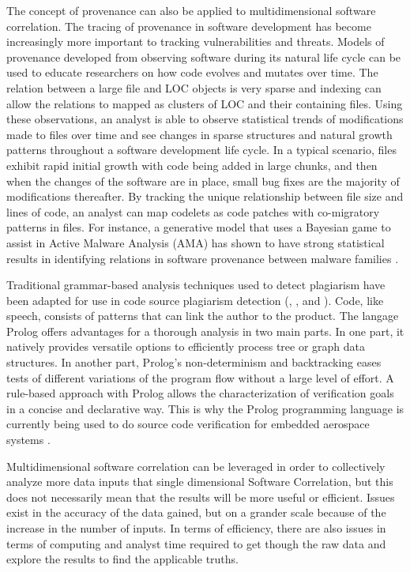 \documentclass[12pt]{report}
\begin{document}
The concept of provenance can also be applied to multidimensional software correlation.  The tracing of provenance in software development has become increasingly more important to tracking vulnerabilities and threats.  Models of provenance developed from observing software during its natural life cycle can be used to educate researchers on how code evolves and mutates over time.  The relation between a large file and LOC objects is very sparse and indexing can allow the relations to mapped as clusters of LOC and their containing files.  Using these observations, an analyst is able to observe statistical trends of modifications made to files over time and see changes in sparse structures and natural growth patterns throughout a software development life cycle.  In a typical scenario, files exhibit rapid initial growth with code being added in large chunks, and then when the changes of the software are in place, small bug fixes are the majority of modifications thereafter.  By tracking the unique relationship between file size and lines of code, an analyst can map codelets as code patches with co-migratory patterns in files.  \cite{provenance2:2014}  For instance, a generative model that uses a Bayesian game to assist in Active Malware Analysis (AMA) has shown to have strong statistical results in identifying relations in software provenance between malware families \cite{sartea2020bayesian}.  

Traditional grammar-based analysis techniques used to detect plagiarism have been adapted for use in code source plagiarism detection (\cite{kustanto2009automatic}, \cite{lesner2010novel}, and \cite{jadalla2008pde4java}).  Code, like speech, consists of patterns that can link the author to the product.  The langage Prolog offers advantages for a thorough analysis in two main parts.  In one part, it natively provides versatile options to efficiently process tree or graph data structures.   In another part, Prolog’s non-determinism and backtracking eases tests of different variations of the program flow without a large level of effort.  A rule-based approach with Prolog allows the characterization of verification goals in a concise and declarative way.  This is why the Prolog programming language is currently being used to do source code verification for embedded aerospace systems \cite{flederer2017source}.  

Multidimensional software correlation can be leveraged in order to collectively analyze more data inputs that single dimensional Software Correlation, but this does not necessarily mean that the results will be more useful or efficient.  Issues exist in the accuracy of the data gained, but on a grander scale because of the increase in the number of inputs.  In terms of efficiency, there are also issues in terms of computing and analyst time required to get though the raw data and explore the results to find the applicable truths.  
\end{document}

